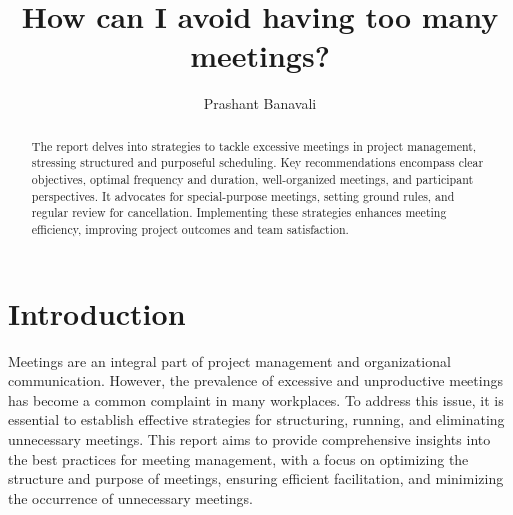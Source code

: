 \documentclass[runningheads]{llncs}
\begin{document}
%
\title{How can I avoid having too many meetings?}
%
%
\author{Prashant Banavali}
%
%
%
\maketitle              %
%
\begin{abstract}
  The report delves into strategies to tackle excessive meetings in project management, stressing structured and purposeful scheduling. Key recommendations encompass clear objectives, optimal frequency and duration, well-organized meetings, and participant perspectives. It advocates for special-purpose meetings, setting ground rules, and regular review for cancellation. Implementing these strategies enhances meeting efficiency, improving project outcomes and team satisfaction.
\end{abstract}
%
%
%
\section{Introduction}
Meetings are an integral part of project management and organizational communication. However, the prevalence of excessive and unproductive meetings has become a common complaint in many workplaces. To address this issue, it is essential to establish effective strategies for structuring, running, and eliminating unnecessary meetings. This report aims to provide comprehensive insights into the best practices for meeting management, with a focus on optimizing the structure and purpose of meetings, ensuring efficient facilitation, and minimizing the occurrence of unnecessary meetings.
\end{document}
